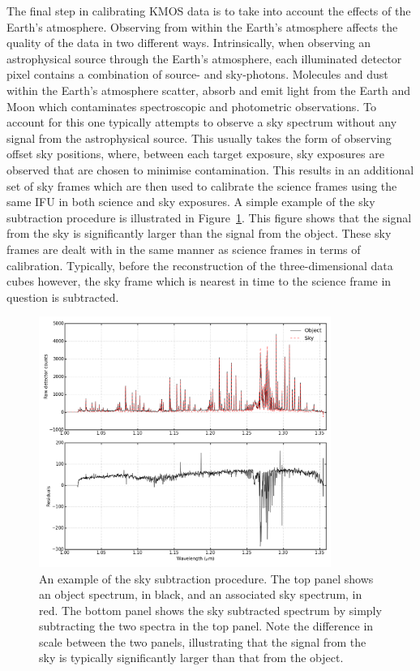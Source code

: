 The final step in calibrating KMOS data is to take into account the effects of the Earth's atmosphere.
Observing from within the Earth's atmosphere affects the quality of the data in two different ways.
Intrinsically, when observing an astrophysical source through the Earth's atmosphere, each illuminated detector pixel contains a combination of source- and sky-photons.
Molecules and dust within the Earth's atmosphere scatter, absorb and emit light from the Earth and Moon which contaminates spectroscopic and photometric observations.
To account for this one typically attempts to observe a sky spectrum without any signal from the astrophysical source.
This usually takes the form of observing offset sky positions, where, between each target exposure, sky exposures are observed that are chosen to minimise contamination.
This results in an additional set of sky frames which are then used to calibrate the science frames using the same IFU in both science and sky exposures.
A simple example of the sky subtraction procedure is illustrated in Figure~\ref{fig:skysub}.
This figure shows that the signal from the sky is significantly larger than the signal from the object.
These sky frames are dealt with in the same manner as science frames in terms of calibration.
Typically, before the reconstruction of the three-dimensional data cubes however, the sky frame which is nearest in time to the science frame in question is subtracted.

\begin{figure}
 \centering
 \includegraphics[width=0.85\textwidth]{kmos/NGC55-19-skysub_basic}
 \caption[An example of the sky subtraction procedure]{An example of the sky subtraction procedure. The top panel shows an object spectrum, in black, and an associated sky spectrum, in red.
 The bottom panel shows the sky subtracted spectrum by simply subtracting the two spectra in the top panel.
 Note the difference in scale between the two panels, illustrating that the signal from the sky is typically significantly larger than that from the object.
 \label{fig:skysub}}
\end{figure}

